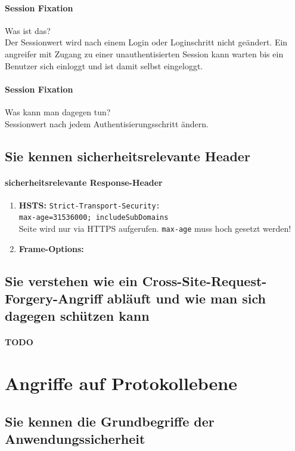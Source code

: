 \documentclass[10pt,a4paper]{article}
\begin{document}
\paragraph*{Session Fixation}Was ist das?\\
Der Sessionwert wird nach einem Login oder Loginschritt nicht geändert. Ein  angreifer mit Zugang zu einer unauthentisierten Session kann warten bis ein Benutzer sich einloggt und ist damit selbst eingeloggt.
\paragraph*{Session Fixation}Was kann man dagegen tun?\\
Sessionwert nach jedem Authentisierungsschritt ändern.

\subsection*{Sie kennen sicherheitsrelevante Header}
\paragraph*{sicherheitsrelevante Response-Header}
\begin{enumerate}[noitemsep,topsep=0pt,leftmargin=*]
    \item \textbf{HSTS:} \texttt{Strict-Transport-Security:\\
    max-age=31536000; includeSubDomains}\\
    Seite wird nur via HTTPS aufgerufen. \texttt{max-age} muss hoch gesetzt werden!
    \item \textbf{Frame-Options:}\texttt{}
\end{enumerate}
\subsection*{Sie verstehen wie ein Cross-Site-Request-Forgery-Angriff abläuft und wie man sich dagegen schützen kann}
\paragraph*{TODO}


\section{Angriffe auf Protokollebene}
\subsection*{Sie kennen die Grundbegriffe der Anwendungssicherheit}
\end{document}
